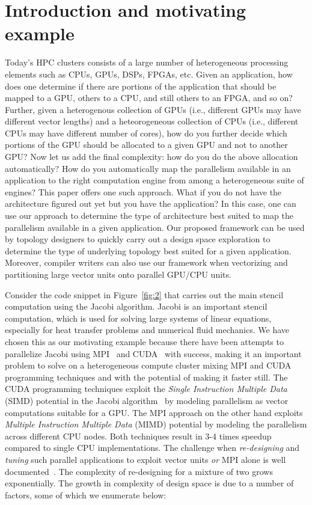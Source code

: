 \section{Introduction and motivating example}
\label{sec:intr-motiv-example}

Today's HPC clusters consists of a large number of heterogeneous
processing elements such as CPUs, GPUs, DSPs, FPGAs, etc. Given an
application, how does one determine if there are portions of the
application that should be mapped to a GPU, others to a CPU, and still
others to an FPGA, and so on? Further, given a heterogenous collection
of GPUs (i.e., different GPUs may have different vector lengths) and a
heteorogeneous collection of CPUs (i.e., different CPUs may have
different number of cores), how do you further decide which portions of
the GPU should be allocated to a given GPU and not to another GPU? Now
let us add the final complexity: how do you do the above allocation
automatically? How do you automatically map the parallelism available in
an application to the right computation engine from among a
heterogeneous suite of engines?  This paper offers one such
approach. What if you do not have the architecture figured out yet but
you have the application? In this case, one can use our approach to
determine the type of architecture best suited to map the parallelism
available in a given application.  Our proposed framework can be used by
topology designers to quickly carry out a design space exploration to
determine the type of underlying topology best suited for a given
application.  Moreover, compiler writers can also use our framework when
vectorizing and partitioning large vector units onto parallel GPU/CPU
units.

Consider the code snippet in Figure~\ref{fig:2} that carries out the
main stencil computation using the Jacobi algorithm. Jacobi is an
important stencil computation, which is used for solving large systems
of linear equations, especially for heat transfer problems and numerical
fluid mechanics. We have chosen this as our motivating example because
there have been attempts to parallelize Jacobi using MPI~\cite{jacobi1}
and CUDA~\cite{jacobi2} with success, making it an important problem to
solve on a heterogeneous compute cluster mixing MPI and CUDA programming
techniques and with the potential of making it faster still. The CUDA
programming techniques exploit the \textit{Single Instruction Multiple
  Data} (SIMD) potential in the Jacobi algorithm~\cite{jacobi2} by
modeling parallelism as vector computations suitable for a GPU. The MPI
approach on the other hand exploits \textit{Multiple Instruction
  Multiple Data} (MIMD) potential by modeling the parallelism across
different CPU nodes. Both techniques result in 3-4 times speedup
compared to single CPU implementations. The challenge when
\textit{re-designing} and \textit{tuning} such parallel applications to
exploit vector units \textit{or} MPI alone is well
documented~\cite{jacobi1,jacobi2}. The complexity of re-designing for a
mixture of two grows exponentially. The growth in complexity of design
space is due to a number of factors, some of which we enumerate below:


